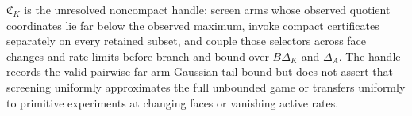 \(\mathfrak C_K\) is the unresolved noncompact handle: screen arms whose observed quotient coordinates lie far below the observed maximum, invoke compact certificates separately on every retained subset, and couple those selectors across face changes and rate limits before branch-and-bound over \(B\Delta_K\) and \(\Delta_A\).  The handle records the valid pairwise far-arm Gaussian tail bound but does not assert that screening uniformly approximates the full unbounded game or transfers uniformly to primitive experiments at changing faces or vanishing active rates.